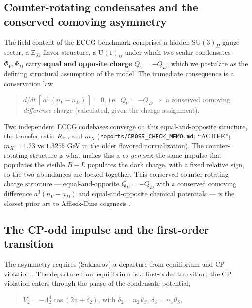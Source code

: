 \documentclass[aps,prd,preprint,nofootinbib,superscriptaddress]{revtex4-2}
\begin{document}
\subsection{Counter-rotating condensates and the conserved comoving
asymmetry}\label{sec-2-1}

The field content of the ECCG benchmark comprises a hidden
\(\mathrm{SU}(3)_H\) gauge sector, a \(\mathbb{Z}_{31}\) flavor
structure, a \(\mathrm{U}(1)_{\mathcal{Q}}\) under which two scalar
condensates \(\Phi_V, \Phi_D\) carry \textbf{equal and opposite charge}
\(Q_V = -Q_D\), which we postulate as the defining structural assumption
of the model. The immediate consequence is a conservation law,

\begin{quote}
\(d/dt\,[\,a^{3}\,(n_V - n_D)\,] = 0\), i.e.~\(Q_V = -Q_D \Rightarrow\)
a conserved comoving \emph{difference} charge (calculated, given the
charge assignment).
\end{quote}

Two independent ECCG codebases converge on this equal-and-opposite
structure, the transfer ratio \(R_{\rm tr}\), and \(m_X\)
(\texttt{reports/\allowbreak CROSS\_\allowbreak CHECK\_\allowbreak MEMO.\allowbreak md}: ``AGREE''; \(m_X = 1.33\) vs
\(1.3255\) GeV in the older flavored normalization). The
counter-rotating structure is what makes this a \emph{co-genesis}: the
same impulse that populates the visible \(B{-}L\) populates the dark
charge, with a fixed relative sign, so the two abundances are locked
together. This conserved counter-rotating charge structure ---
equal-and-opposite \(Q_V = -Q_D\) with a conserved comoving difference
\(a^{3}(n_V - n_D)\) and equal-and-opposite chemical potentials --- is
the closest prior art to Affleck-Dine cogenesis \citep{Cheung:2011if}.

\subsection{The CP-odd impulse and the first-order
transition}\label{sec-2-2}

The asymmetry requires (Sakharov) a departure from equilibrium and CP
violation \citep{Morrissey:2012db}. The departure from equilibrium is a
first-order transition; the CP violation enters through the phase of the
condensate potential,

\begin{quote}
\(V_2 = -\Lambda_2^{4} \cos(2\psi + \delta_2)\), with
\(\delta_2 = n_2\,\theta_S\), \(\delta_3 = n_3\,\theta_S\),
\end{quote}
\end{document}

